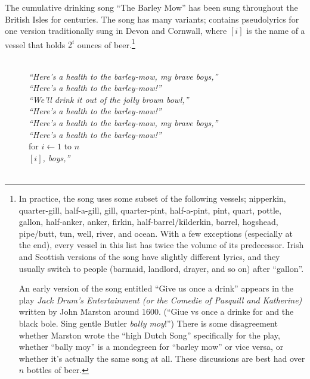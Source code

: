 \begin{exercises}
\item The cumulative drinking song “The Barley Mow” has been sung throughout the British Isles for centuries. The song has many variants;  contains pseudolyrics for one version traditionally sung in Devon and Cornwall, where $[i]$ is the name of a vessel that holds $2^i$ ounces of beer.\footnote{In practice, the song uses some subset of the following vessels; nipperkin, quarter-gill, half-a-gill, gill, quarter-pint, half-a-pint, pint, quart, pottle, gallon, half-anker, anker, firkin, half-barrel/kilderkin, barrel, hogshead, pipe/butt, tun, well, river, and ocean. With a few exceptions (especially at the end), every vessel in this list has twice the volume of its predecessor. Irish and Scottish versions of the song have slightly different lyrics, and they usually switch to people (barmaid, landlord, drayer, and so on) after “gallon”.\par An early version of the song entitled “Give us once a drink” appears in the play \textit{Jack Drum’s Entertainment (or the Comedie of Pasquill and Katherine)} written by John Marston around 1600. (“Giue vs once a drinke for and the black bole. Sing gentle Butler \textit{bally moy}!”) There is some disagreement whether Marston wrote the “high Dutch Song” specifically for the play, whether “bally moy” is a mondegreen for “barley mow” or vice versa, or whether it’s actually the same song at all. These discussions are best had over $n$ bottles of beer.}
\begin{figure}[ht]
\centering
\begin{pseudocode}
\\
{\sffamily\itshape “Here’s a health to the barley-mow, my brave boys,”}\\
{\sffamily\itshape “Here’s a health to the barley-mow!”}\\[0.8ex]
{\sffamily\itshape “We’ll drink it out of the jolly brown bowl,”}\\
{\sffamily\itshape “Here’s a health to the barley-mow!”}\\
{\sffamily\itshape “Here’s a health to the barley-mow, my brave boys,”}\\
{\sffamily\itshape “Here’s a health to the barley-mow!”}\\[0.8ex]
for $i \gets 1$ to $n$\\
 $[i]${\sffamily\itshape , boys,”}\\
\\

\end{pseudocode}
\end{figure}
\end{exercises}
